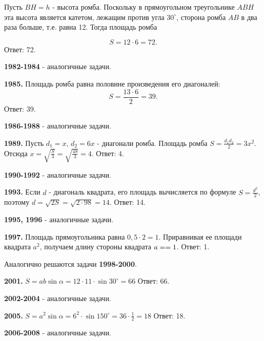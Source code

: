 Пусть $BH = h$ - высота ромба. Поскольку в прямоугольном треугольнике $ABH$ эта высота является катетом, лежащим против угла $30^\circ$, сторона ромба $AB$ в два раза больше, т.е. равна 12. Тогда площадь ромба

\[
S = 12 \cdot 6 = 72.
\]
\null \hspace*{\fill} Ответ: 72.

\textbf{1982-1984} - аналогичные задачи.

\textbf{1985.} Площадь ромба равна половине произведения его диагоналей:
\[
S = \frac{13\cdot6}{2}=39.
\]
\null \hspace*{\fill} Ответ: 39.

\textbf{1986-1988} - аналогичные задачи.

\textbf{1989.} Пусть $d_1=x$, $d_2=6x$ - диагонали ромба. Площадь ромба $S = \frac{d_1d_2}{2}=3x^2$. Отсюда $x = \sqrt{\frac{S}{3}} = \sqrt{\frac{48}{3}}=4$. \newline \null \hspace*{\fill} Ответ: 4.

\textbf{1990-1992} - аналогичные задачи.

\textbf{1993.}  Если $d$ - диагональ квадрата, его площадь вычисляется по формуле $S = \frac{d^2}{2}$, поэтому $d = \sqrt{2S} = \sqrt{2\cdot98}=14.$ \newline \null \hspace*{\fill} Ответ: 14.

\textbf{1995, 1996} - аналогичные задачи.

\textbf{1997.} Площадь прямоугольника равна $0,5\cdot2=1$.  Приравнивая ее площади квадрата $a^2$, получаем длину стороны квадрата $a=\linebreak=1$.
\newline \null \hspace*{\fill} Ответ: 1.

Аналогично решаются задачи \textbf{1998-2000}.

\textbf{2001.} $S = ab\sin{\alpha}=12\cdot11\cdot\sin{30^\circ}=66$ \newline \null \hspace*{\fill} Ответ: 66.

\textbf{2002-2004} - аналогичные задачи.

\textbf{2005.} $S = a^2\sin{\alpha}=6^2\cdot\sin{150^\circ}=36\cdot\frac{1}{2}=18$ \newline \null \hspace*{\fill} Ответ: 18.

\textbf{2006-2008} - аналогичные задачи.

